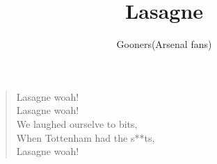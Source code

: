 \documentclass[a4paper,12pt]{article}
\title{Lasagne}
\author{Gooners(Arsenal fans)}
\date{}
\begin{document}
	
	\maketitle
	
	\begin{verse}
		
		Lasagne woah! \\
		Lasagne woah! \\
		We laughed ourselve to bits, \\
		When Tottenham had the s**ts, \\
		Lasagne woah!
		
	\end{verse}
	
\end{document}
